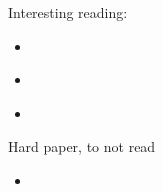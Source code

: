 Interesting reading:
\begin{itemize}
    \item \citet{Candes_Wakin_Boyd08}
    \item \citet{Arlot_Celisse10}
    \item \citet{Pedregosa16}
\end{itemize}
%
Hard paper, to not read
\begin{itemize}
    \item \citet{Deledalle_Vaiter_Fadili_Peyre14}
\end{itemize}
